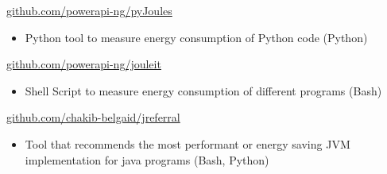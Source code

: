 \documentclass[10pt,a4paper,ragged2e,withhyper]{altacv}
\begin{document}
\begin{paracol}{2}












  \divider
   {\href{https://github.com/powerapi-ng/pyJoules}{github.com/powerapi-ng/pyJoules}}{}{}
  \begin{itemize}
    \item  Python tool to measure energy consumption of Python code (Python)
  \end{itemize}

  \divider
   {\href{https://github.com/powerapi-ng/jouleit}{github.com/powerapi-ng/jouleit}}{}{}
  \begin{itemize}
    \item  Shell Script to measure energy consumption of different programs (Bash)
  \end{itemize}

  \divider
   {\href{https://github.com/chakib-belgaid/jreferral}{github.com/chakib-belgaid/jreferral}}{}{}
  \begin{itemize}
    \item  Tool that recommends the most performant or energy saving JVM implementation for java programs (Bash, Python)
  \end{itemize}


\end{paracol}
\end{document}
